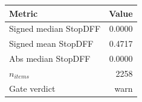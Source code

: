 \begin{tabular}{lr}
\toprule
Metric & Value \\
\midrule
Signed median StopDFF & 0.0000 \\
Signed mean StopDFF & 0.4717 \\
Abs median StopDFF & 0.0000 \\
$n_{items}$ & 2258 \\
Gate verdict & warn \\
\bottomrule
\end{tabular}
